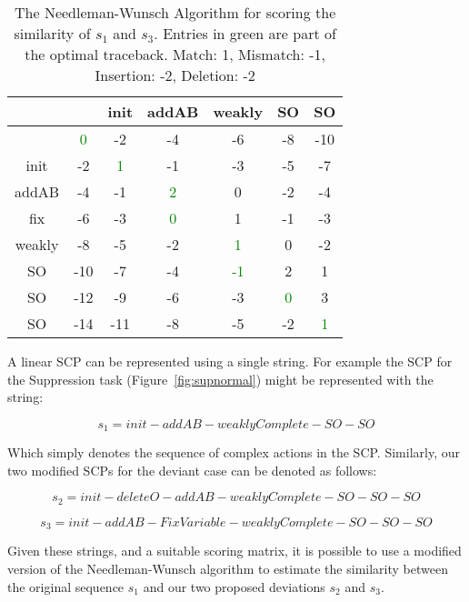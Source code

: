 \begin{table}
\begin{center}

\begin{tabular}{ c | c c c c c c}
& & init & addAB & weakly  & SO & SO \\ \hline
& \textcolor{green}{0}  & -2  & -4 & -6  & -8  & -10 \\

init & -2 & \textcolor{green}{1} & -1 & -3 & -5 & -7 \\

addAB & -4 & -1 & \textcolor{green}{2} & 0 & -2 & -4 \\

fix &-6 & -3 & \textcolor{green}{0} & 1 & -1 & -3  \\

weakly& -8& -5 & -2 & \textcolor{green}{1} & 0 & -2  \\

SO & -10& -7 & -4 & \textcolor{green}{-1} & 2 & 1  \\

SO & -12& -9 & -6 & -3 & \textcolor{green}{0} & 3  \\

SO & -14 & -11 & -8 & -5 & -2 & \textcolor{green}{1}  \\
 
\end{tabular}
\caption{The Needleman-Wunsch Algorithm for scoring the similarity of $s_1$ and $s_3$. Entries in green are part of the optimal traceback. Match: 1, Mismatch: -1, Insertion: -2, Deletion: -2}
\label{tbl:needs1s3}

\end{center}
\end{table}

A linear SCP can be represented using a single string. For example the SCP for the Suppression task (Figure~\ref{fig:supnormal}) might be represented with the string:

\[s_1=init-addAB-weaklyComplete-SO-SO\]

Which simply denotes the sequence of complex actions in the SCP. Similarly, our two modified SCPs for the deviant case can be denoted as follows:


\[s_2=init-deleteO-addAB-weaklyComplete-SO-SO-SO\]

\[s_3=init-addAB-FixVariable-weaklyComplete-SO-SO-SO\]

Given these strings, and a suitable scoring matrix, it is possible to use a modified version of the Needleman-Wunsch algorithm to estimate the similarity between the original sequence $s_1$ and our two proposed deviations $s_2$ and $s_3$.

